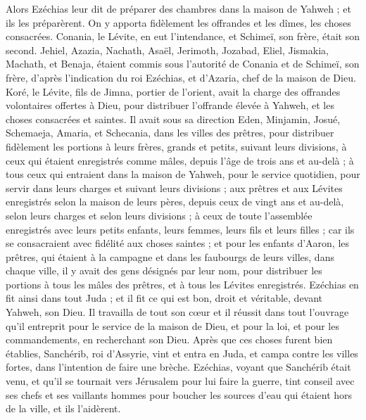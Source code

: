 \begin{multicols}{2}
Alors Ezéchias leur dit de préparer des chambres dans la maison de Yahweh ; et ils les préparèrent.
On y apporta fidèlement les offrandes et les dîmes, les choses consacrées. Conania, le Lévite, en eut l'intendance, et Schimeï, son frère, était son second.
Jehiel, Azazia, Nachath, Asaël, Jerimoth, Jozabad, Eliel, Jismakia, Machath, et Benaja, étaient commis sous l'autorité de Conania et de Schimeï, son frère, d'après l'indication du roi Ezéchias, et d'Azaria, chef de la maison de Dieu.
Koré, le Lévite, fils de Jimna, portier de l'orient, avait la charge des offrandes volontaires offertes à Dieu, pour distribuer l'offrande élevée à Yahweh, et les choses consacrées et saintes.
Il avait sous sa direction Eden, Minjamin, Josué, Schemaeja, Amaria, et Schecania, dans les villes des prêtres, pour distribuer fidèlement les portions à leurs frères, grands et petits, suivant leurs divisions,
à ceux qui étaient enregistrés comme mâles, depuis l'âge de trois ans et au-delà ; à tous ceux qui entraient dans la maison de Yahweh, pour le service quotidien, pour servir dans leurs charges et suivant leurs divisions ;
aux prêtres et aux Lévites enregistrés selon la maison de leurs pères, depuis ceux de vingt ans et au-delà, selon leurs charges et selon leurs divisions ;
à ceux de toute l'assemblée enregistrés avec leurs petits enfants, leurs femmes, leurs fils et leurs filles ; car ils se consacraient avec fidélité aux choses saintes ;
et pour les enfants d'Aaron, les prêtres, qui étaient à la campagne et dans les faubourgs de leurs villes, dans chaque ville, il y avait des gens désignés par leur nom, pour distribuer les portions à tous les mâles des prêtres, et à tous les Lévites enregistrés.
Ezéchias en fit ainsi dans tout Juda ; et il fit ce qui est bon, droit et véritable, devant Yahweh, son Dieu.
Il travailla de tout son cœur et il réussit dans tout l'ouvrage qu'il entreprit pour le service de la maison de Dieu, et pour la loi, et pour les commandements, en recherchant son Dieu.
\VerseOne{}Après que ces choses furent bien établies, Sanchérib, roi d'Assyrie, vint et entra en Juda, et campa contre les villes fortes, dans l'intention de faire une brèche.
Ezéchias, voyant que Sanchérib était venu, et qu'il se tournait vers Jérusalem pour lui faire la guerre,
tint conseil avec ses chefs et ses vaillants hommes pour boucher les sources d'eau qui étaient hors de la ville, et ils l'aidèrent.

\end{multicols}
